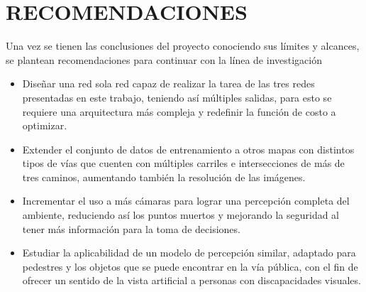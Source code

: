 \section{RECOMENDACIONES}
Una vez se tienen las conclusiones del proyecto conociendo sus límites y alcances, se plantean recomendaciones para continuar con la línea de investigación

\begin{itemize}[nosep]
	\item Diseñar una red sola red capaz de realizar la tarea de las tres redes presentadas en este trabajo, teniendo así múltiples salidas, para esto se requiere una arquitectura más compleja y redefinir la función de costo a optimizar.
	\item Extender el conjunto de datos de entrenamiento a otros mapas con distintos tipos de vías que cuenten con múltiples carriles e intersecciones de más de tres caminos, aumentando también la resolución de las imágenes.
	\item Incrementar el uso a más cámaras para lograr una percepción completa del ambiente, reduciendo así los puntos muertos y mejorando la seguridad al tener más información para la toma de decisiones.
	\item Estudiar la aplicabilidad de un modelo de percepción similar, adaptado para pedestres y los objetos que se puede encontrar en la vía pública, con el fin de ofrecer un sentido de la vista artificial a personas con discapacidades visuales.
\end{itemize}
